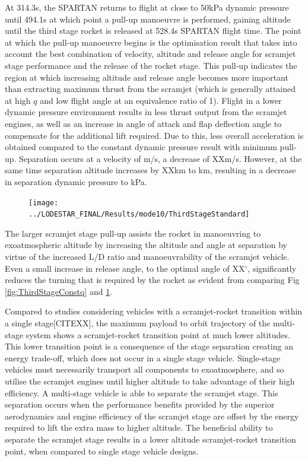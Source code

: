 At 314.3s, the SPARTAN returns to flight at close to 50kPa dynamic pressure until 494.1s at which point a pull-up manoeuvre is performed, gaining altitude until the third stage rocket is released at 528.4s SPARTAN flight time. 
 The point at which the pull-up manoeuvre begins is the optimisation result that takes into account the best combination of velocity, altitude and release angle for scramjet stage performance and the release of the rocket stage. This pull-up indicates the region at which increasing altitude and release angle becomes more important than extracting maximum thrust from the scramjet (which is generally attained at high $q$ and low flight angle at an equivalence ratio of 1).
Flight in a lower dynamic pressure environment results in less thrust output from the scramjet engines, as well as an increase in angle of attack and flap deflection angle to compensate for the additional lift required. Due to this, less overall acceleration is obtained compared to the constant dynamic pressure result with minimum pull-up. Separation occurs at a velocity of \secondthirdSeparationvStandardNoReturn m/s, a decrease of XXm/s. However, at the same time separation altitude increases by XXkm to \secondthirdSeparationAltqStandardNoReturn km, resulting in a decrease in separation dynamic pressure to \secondthirdSeparationqStandardNoReturn kPa. 
\begin{figure}[ht!]
	\centering
	\texttt{[image: ../LODESTAR\_FINAL/Results/mode10/ThirdStageStandard]}
	\caption{}
	\label{fig:ThirdStageStandardNoReturn}
\end{figure}

The larger scramjet stage pull-up assists the rocket in manoeuvring to exoatmospheric altitude by increasing the altitude and angle at separation by virtue of the increased L/D ratio and manoeuvrability of the scramjet vehicle. Even a small increase in release angle, to the optimal angle of XX$^\circ$, significantly reduces the turning that is required by the rocket as evident from comparing Fig \ref{fig:ThirdStageConstq} and \ref{fig:ThirdStageStandardNoReturn}. 


Compared to studies considering vehicles with a scramjet-rocket transition within a single stage\cite{Lu1993,Trefny1999}[CITEXX], the maximum payload to orbit trajectory of the multi-stage system shows a scramjet-rocket transition point at much lower altitudes.
This lower transition point is a consequence of the stage separation creating an energy trade-off, which does not occur in a single stage vehicle. Single-stage vehicles must necessarily transport all components to exoatmosphere, and so utilise the scramjet engines until higher altitude to take advantage of their high efficiency. A multi-stage vehicle is able to separate the scramjet stage. 
This separation occurs when the performance benefits provided by the superior aerodynamics and engine efficiency of the scramjet stage are offset by the energy required to lift the extra mass to higher altitude. The beneficial ability
to separate the scramjet stage results in a lower altitude scramjet-rocket transition point, when compared to single
stage vehicle designs.






